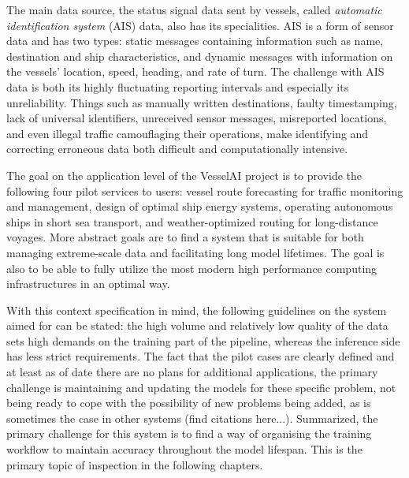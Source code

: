 The main data source, the status signal data sent by vessels, called \textit{automatic identification system} (AIS) data, also has its specialities. AIS is a form of sensor data and has two types: static messages containing information such as name, destination and ship characteristics, and dynamic messages with information on the vessels' location, speed, heading, and rate of turn. The challenge with AIS data is both its highly fluctuating reporting intervals and especially its unreliability.  Things such as manually written destinations, faulty timestamping, lack of universal identifiers, unreceived sensor messages, misreported locations, and even illegal traffic camouflaging their operations, make identifying and correcting erroneous data both difficult and computationally intensive.

The goal on the application level of the VesselAI project is to provide the following four pilot services to users: vessel route forecasting for traffic monitoring and management, design of optimal ship energy systems, operating autonomous ships in short sea transport, and weather-optimized routing for long-distance voyages. More abstract goals are to find a system that is suitable for both managing extreme-scale data and facilitating long model lifetimes. The goal is also to be able to fully utilize the most modern high performance computing infrastructures in an optimal way.

With this context specification in mind, the following guidelines on the system aimed for can be stated: the high volume and relatively low quality of the data sets high demands on the training part of the pipeline, whereas the inference side has less strict requirements. The fact that the pilot cases are clearly defined and at least as of date there are no plans for additional applications, the primary challenge is maintaining and updating the models for these specific problem, not being ready to cope with the possibility of new problems being added, as is sometimes the case in other systems (find citations here...).  Summarized, the primary challenge for this system is to find a way of organising the training workflow to maintain accuracy throughout the model lifespan. This is the primary topic of inspection in the following chapters.



